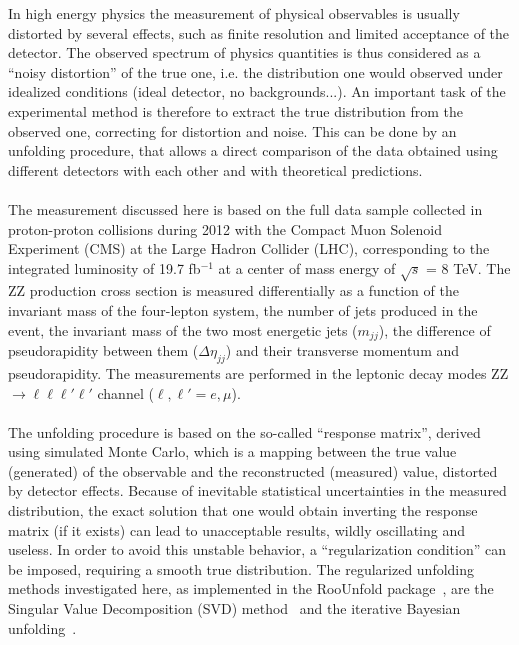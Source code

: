 In high energy physics the measurement of physical observables is usually distorted by several effects, such as finite resolution and limited acceptance of the detector.
The observed spectrum of physics quantities is thus considered as a ``noisy distortion'' of the true one, i.e. the distribution one would observed under idealized 
conditions (ideal detector, no backgrounds...). An important task of the experimental method is therefore to extract the true distribution from the 
observed one, correcting for distortion and noise. This can be done by an unfolding procedure, that allows a direct comparison of the data obtained using different 
detectors with each other and with theoretical predictions.\\
\\
The measurement discussed here is based on the full data sample collected in proton-proton collisions during 2012 with the Compact Muon Solenoid Experiment (CMS) at the Large Hadron Collider (LHC), corresponding to the integrated luminosity of 19.7 fb$^{-1}$ at a center of mass energy of $\sqrt{s}$ = 8 TeV. The ZZ production cross section 
is measured differentially as a function of the invariant mass of the four-lepton system, the number of jets produced in the 
event, the invariant mass of the two most energetic jets ($m_{jj}$), the difference of pseudorapidity between them 
($\Delta\eta_{jj}$) and their transverse momentum and pseudorapidity. 
The measurements are performed in the leptonic decay modes ZZ $\to \ell\ell\ell'\ell'$ channel ($\ell,\ell' = e, \mu$). \\
\\
The unfolding procedure is based on the so-called ``response matrix'', derived using simulated Monte Carlo, which is a mapping between the true value (generated) 
of the observable and the reconstructed (measured) value, distorted by detector effects. Because of inevitable statistical uncertainties in the measured
distribution, the exact solution  that one would obtain inverting the response matrix (if it exists) can lead to unacceptable results, wildly oscillating and useless. 
In order to avoid this unstable behavior, a ``regularization condition'' can be imposed, requiring a smooth true distribution. The regularized unfolding methods 
investigated here, as implemented in the RooUnfold package~\cite{RooUnfold}, are the Singular Value Decomposition (SVD) method~\cite{SVD} and the iterative Bayesian unfolding~\cite{DAgostini}.

